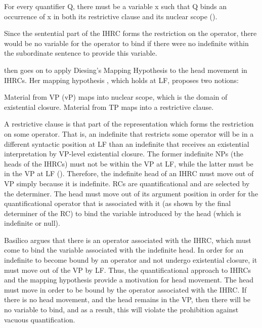 \documentclass[output=paper]{LSP/langsci}
\begin{document}
\ea For every quantifier Q, there must be a variable x such that Q binds an occurrence of x in both its restrictive clause and its nuclear scope (\citealt{Kratzer1989}). \label{boyle44} 
\z

Since the sentential part of the IHRC forms the restriction on the operator, there would be no variable for the operator to bind if there were no indefinite within the subordinate sentence to provide this variable.

\citeauthor{Basilico1996} then goes on to apply Diesing's \citeyearpar{Diesing1990, Diesing1992a, Diesing1992b} Mapping Hypothesis to the head movement in IHRCs. Her mapping hypothesis \citeyearpar{Diesing1992a, Diesing1992b}, which holds at LF, proposes two notions:

\ea \label{boyle45}
\begin{xlist}
\ex Material from VP (vP) maps into nuclear scope, which is the domain of existential closure.
\ex Material from TP maps into a restrictive clause.
\end{xlist}
\z
 
A restrictive clause is that part of the representation which forms the restriction on some operator. That is, an indefinite that restricts some operator will be in a different syntactic position at LF than an indefinite that receives an existential interpretation by VP-level existential closure. The former indefinite NPs (the heads of the IHRCs) must not be within the VP at LF, while the latter must be in the VP at LF (\citealt{Basilico1996}). Therefore, the indefinite head of an IHRC must move out of VP simply because it is indefinite. RCs are quantificational and are selected by the determiner. The head must move out of its argument position in order for the quantificational operator that is associated with it (as shown by the final determiner of the RC) to bind the variable introduced by the head (which is indefinite or null).   
	
Basilico argues that there is an operator associated with the IHRC, which must come to bind the variable associated with the indefinite head. In order for an indefinite to become bound by an operator and not undergo existential closure, it must move out of the VP by LF. Thus, the quantificational approach to IHRCs and the mapping hypothesis provide a motivation for head movement. The head must move in order to be bound by the operator associated with the IHRC. If there is no head movement, and the head remains in the VP, then there will be no variable to bind, and as a result, this will violate the prohibition against vacuous quantification.  
	
\end{document}
